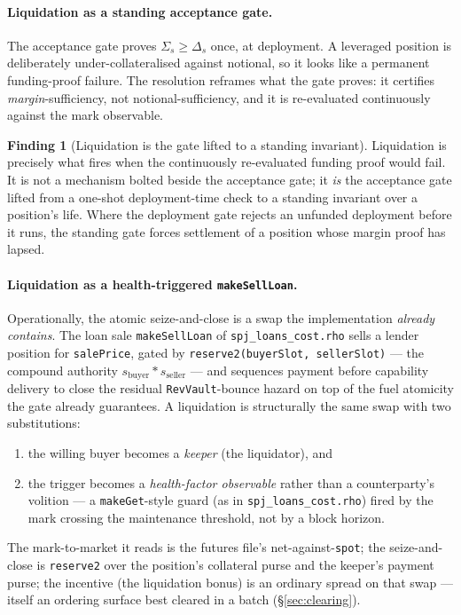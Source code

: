\documentclass[11pt]{article}
\theoremstyle{definition}
\newtheorem{finding}{Finding}
\newcommand{\tensorsig}{\ensuremath{\ast}}
\begin{document}
\paragraph{Liquidation as a standing acceptance gate.}
The acceptance gate proves $\Sigma_s \ge \Delta_s$ once, at deployment. A leveraged position is
deliberately under-collateralised against notional, so it looks like a permanent funding-proof
failure. The resolution reframes what the gate proves: it certifies \emph{margin}-sufficiency, not
notional-sufficiency, and it is re-evaluated continuously against the mark observable.

\begin{finding}[Liquidation is the gate lifted to a standing invariant]\label{find:liq-gate}
Liquidation is precisely what fires when the continuously re-evaluated funding proof would fail. It
is not a mechanism bolted beside the acceptance gate; it \emph{is} the acceptance gate lifted from a
one-shot deployment-time check to a standing invariant over a position's life. Where the deployment
gate rejects an unfunded deployment before it runs, the standing gate forces settlement of a position
whose margin proof has lapsed.
\end{finding}

\paragraph{Liquidation as a health-triggered \texttt{makeSellLoan}.}
Operationally, the atomic seize-and-close is a swap the implementation \emph{already contains}. The
loan sale \texttt{makeSellLoan} of \texttt{spj\_loans\_cost.rho} sells a lender position for
\texttt{salePrice}, gated by \texttt{reserve2(buyerSlot, sellerSlot)} --- the compound authority
$s_{\text{buyer}} \tensorsig s_{\text{seller}}$ --- and sequences payment before capability delivery
to close the residual \texttt{RevVault}-bounce hazard on top of the fuel atomicity the gate already
guarantees. A liquidation is structurally the same swap with two substitutions:
\begin{enumerate}[label=(\roman*),leftmargin=2em]
\item the willing buyer becomes a \emph{keeper} (the liquidator), and
\item the trigger becomes a \emph{health-factor observable} rather than a counterparty's volition ---
a \texttt{makeGet}-style guard (as in \texttt{spj\_loans\_cost.rho}) fired by the mark crossing the
maintenance threshold, not by a block horizon.
\end{enumerate}
The mark-to-market it reads is the futures file's net-against-\texttt{spot}; the seize-and-close is
\texttt{reserve2} over the position's collateral purse and the keeper's payment purse; the incentive
(the liquidation bonus) is an ordinary spread on that swap --- itself an ordering surface best cleared
in a batch (\S\ref{sec:clearing}).
\end{document}
